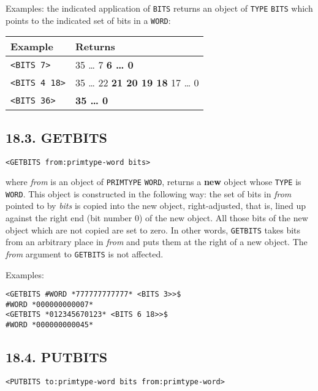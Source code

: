 \documentclass[a4paper,]{article}
\begin{document}
Examples: the indicated application of \texttt{BITS} returns an object of \texttt{TYPE} \texttt{BITS} which points to the
indicated set of bits in a \texttt{WORD}:

\begin{longtable}[]{@{}ll@{}}
\toprule
Example & Returns\tabularnewline
\midrule
\endhead
\texttt{\textless{}BITS\ 7\textgreater{}} & 35 \ldots{} 7 \textbf{6 \ldots{} 0}\tabularnewline
\texttt{\textless{}BITS\ 4\ 18\textgreater{}} & 35 \ldots{} 22 \textbf{21 20 19 18} 17 \ldots{} 0\tabularnewline
\texttt{\textless{}BITS\ 36\textgreater{}} & \textbf{35 \ldots{} 0}\tabularnewline
\bottomrule
\end{longtable}

\subsection{18.3. GETBITS}\label{getbits}

\begin{verbatim}
<GETBITS from:primtype-word bits>
\end{verbatim}

 where \emph{from} is an object of \texttt{PRIMTYPE} \texttt{WORD}, returns a \textbf{new}
object whose \texttt{TYPE} is \texttt{WORD}. This object is constructed in the following way: the set of bits in
\emph{from} pointed to by \emph{bits} is copied into the new object, right-adjusted, that is, lined up against the right
end (bit number 0) of the new object. All those bits of the new object which are not copied are set to zero. In other
words, \texttt{GETBITS} takes bits from an arbitrary place in \emph{from} and puts them at the right of a new object. The
\emph{from} argument to \texttt{GETBITS} is not affected.

Examples:

\begin{verbatim}
<GETBITS #WORD *777777777777* <BITS 3>>$
#WORD *000000000007*
<GETBITS *012345670123* <BITS 6 18>>$
#WORD *000000000045*
\end{verbatim}

\subsection{18.4. PUTBITS}\label{putbits}

\begin{verbatim}
<PUTBITS to:primtype-word bits from:primtype-word>
\end{verbatim}
\end{document}
